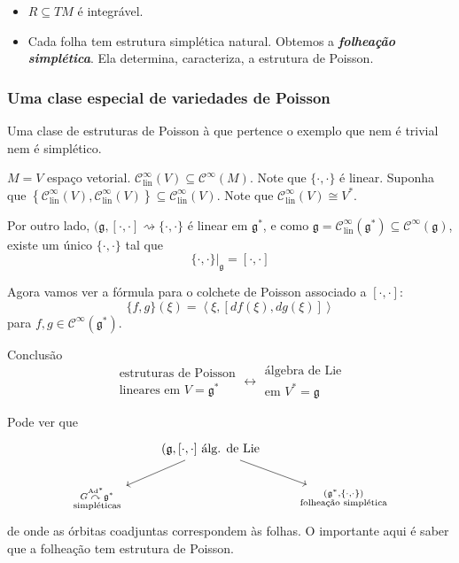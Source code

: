 \begin{thm}\leavevmode
	\begin{itemize}
	\item $R\subseteq TM$ é integrável.
	\item Cada folha tem estrutura simplética natural. Obtemos a \textit{\textbf{folheação simplética}}. Ela determina, caracteriza, a estrutura de Poisson.
	\end{itemize}
\end{thm}

\subsubsection{Uma clase especial de variedades de Poisson}

Uma clase de estruturas de Poisson à que pertence o exemplo que nem é trivial nem é simplético.

$M=V$ espaço vetorial. $\mathcal{C}^\infty_{\operatorname{lin}}(V)\subseteq \mathcal{C}^\infty(M)$. Note que  $\{\cdot,\cdot\}$ é linear. Suponha que $\left\{ \mathcal{C}^\infty_{\operatorname{lin}}(V),\mathcal{C}^\infty_{\operatorname{lin}}(V) \right\} \subseteq \mathcal{C}^\infty_{\operatorname{lin}}(V)$. Note que $\mathcal{C}^\infty_{\operatorname{lin}}(V)\cong V^*$.

Por outro lado, $(\mathfrak{g},[\cdot,\cdot ]\rightsquigarrow \{\cdot,\cdot\}$ é linear em $\mathfrak{g}^*$, e como $\mathfrak{g} =\mathcal{C}^\infty_{\operatorname{lin}}(\mathfrak{g}^*)\subseteq \mathcal{C}^\infty(\mathfrak{g})$, existe um único $\{\cdot,\cdot\}$ tal que
\[\{\cdot,\cdot\}|_{\mathfrak{g}}=[\cdot,\cdot ]\]

Agora vamos ver a fórmula para o colchete de Poisson associado a $[\cdot,\cdot ]$:
\[\{f,g\}(\xi)=\left<\xi,[df(\xi),dg(\xi)]\right> \]
para $f,g\in\mathcal{C}^\infty(\mathfrak{g}^*)$.

\begin{idea4}{Conclusão}\leavevmode
	\[\substack{\text{estruturas de Poisson}  \\ \text{lineares em $V=\mathfrak{g}^*$} }\longleftrightarrow \substack{\text{álgebra de Lie}  \\ \text{em $V^*=\mathfrak{g}$} }\]
\end{idea4}

Pode ver que
\[\begin{tikzcd}
	&(\mathfrak{g},[\cdot,\cdot ]\text{ álg. de Lie} \arrow[dl]\arrow[dr]\\
	\substack{ G \overset{\operatorname{Ad}^*}{\curvearrowright}\mathfrak{g}^*\\\text{simpléticas}} && \substack{(\mathfrak{g}^* ,\{\cdot,\cdot\})\\\text{folheação simplética}} 
\end{tikzcd}\]
de onde as órbitas coadjuntas correspondem às folhas. O importante aqui é saber que a folheação tem estrutura de Poisson.


